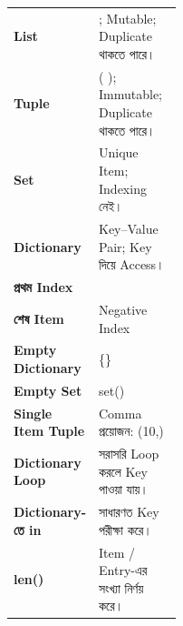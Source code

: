 \begin{rememberbox}

\begin{tabularx}
{\linewidth}
{
>{\bfseries\RaggedRight\arraybackslash}p{0.37\linewidth}
Y
}

List
&
\textenglish{\ttfamily [ ]}; Mutable; Duplicate থাকতে পারে।
\\[0.45mm]

Tuple
&
\textenglish{\ttfamily ( )}; Immutable; Duplicate থাকতে পারে।
\\[0.45mm]

Set
&
Unique Item; Indexing নেই।
\\[0.45mm]

Dictionary
&
Key--Value Pair; Key দিয়ে Access।
\\[0.45mm]

প্রথম Index
&
\textenglish{}
\\[0.45mm]

শেষ Item
&
Negative Index
\textenglish{}
\\[0.45mm]

Empty Dictionary
&
\textenglish{\ttfamily \{\}}
\\[0.45mm]

Empty Set
&
\textenglish{\ttfamily set()}
\\[0.45mm]

Single Item Tuple
&
Comma প্রয়োজন:
\textenglish{\ttfamily (10,)}
\\[0.45mm]

Dictionary Loop
&
সরাসরি Loop করলে Key পাওয়া যায়।
\\[0.45mm]

Dictionary-তে \textenglish{\ttfamily in}
&
সাধারণত Key পরীক্ষা করে।
\\[0.45mm]

\textenglish{\ttfamily len()}
&
Item / Entry-এর সংখ্যা নির্ণয় করে।
\\

\end{tabularx}

\end{rememberbox}



